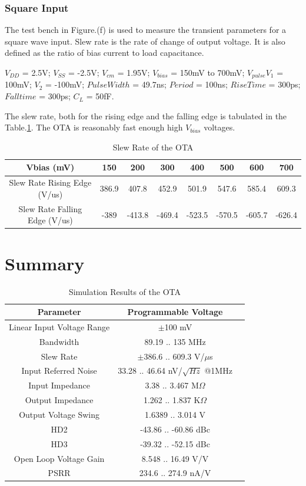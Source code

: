 \subsubsection{Square Input}
The test bench in Figure.(f) is used to measure the transient parameters for a square wave input. Slew rate is the rate of change of output voltage. It is also defined as the ratio of bias current to load capacitance.

$V_{DD}$ = 2.5V; $V_{SS}$ = -2.5V; $V_{cm}$ = 1.95V; $V_{bias}$ = 150mV to 700mV;  $V_{pulse} V_1$ = 100mV; $V_2$ = -100mV; $Pulse Width$ = 49.7ns; $Period$ = 100ns; $Rise Time$ = 300ps; $Fall time$ = 300ps; $C_{L}$ = 50fF.

The slew rate, both for the rising edge and the falling edge is tabulated in the Table.\ref{tab:OTA_Slew}. The OTA is reasonably fast enough high $V_{bias}$ voltages.

\begin{table} [H]
\centering
\begin{tabular}{@{}cccccccc@{}}
\toprule
Vbias (mV)					& 150			& 200			& 300			& 400			& 500			& 600			& 700 \\ \midrule
Slew Rate Rising Edge (V/us)			& 386.9		& 407.8		& 452.9		& 501.9 	& 547.6		& 585.4		& 609.3 \\
Slew Rate Falling Edge (V/us)			& -389		& -413.8		& -469.4		& -523.5		& -570.5		& -605.7		& -626.4 \\
\bottomrule
\end{tabular}
\caption{Slew Rate of the OTA}
\label{tab:OTA_Slew}
\end{table}

\section{Summary}
\begin{table} [H]
\centering
\begin{tabular}{@{}ccc@{}}
\toprule
Parameter						& Programmable Voltage	\\ \midrule
Linear Input Voltage Range		& $\pm$100 mV			\\
Bandwidth						& 89.19 .. 135 MHz				\\
Slew Rate						& $\pm$386.6 .. 609.3 V/$\mu$s	\\
Input Referred Noise			& 33.28 .. 46.64 nV/$\sqrt{Hz}$ @1MHz \\
Input Impedance					& 3.38 .. 3.467 M$\Omega$		\\
Output Impedance				& 1.262 .. 1.837 K$\Omega$		\\
Output Voltage Swing			& 1.6389 .. 3.014 V				\\
HD2								& -43.86 .. -60.86 dBc			\\
HD3								& -39.32 .. -52.15 dBc			\\
Open Loop Voltage Gain			& 8.548 .. 16.49 V/V			\\
PSRR							& 234.6 .. 274.9 nA/V			\\
\bottomrule
\end{tabular}
\caption{Simulation Results of the OTA}
\label{tab:Results}
\end{table}